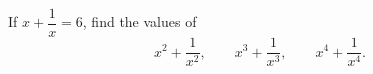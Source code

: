 If $x+\dfrac{1}{x}=6$, find the values of
\[x^2+\dfrac{1}{x^2},\qquad x^3+\dfrac{1}{x^3},\qquad x^4+\dfrac{1}{x^4}.\]
